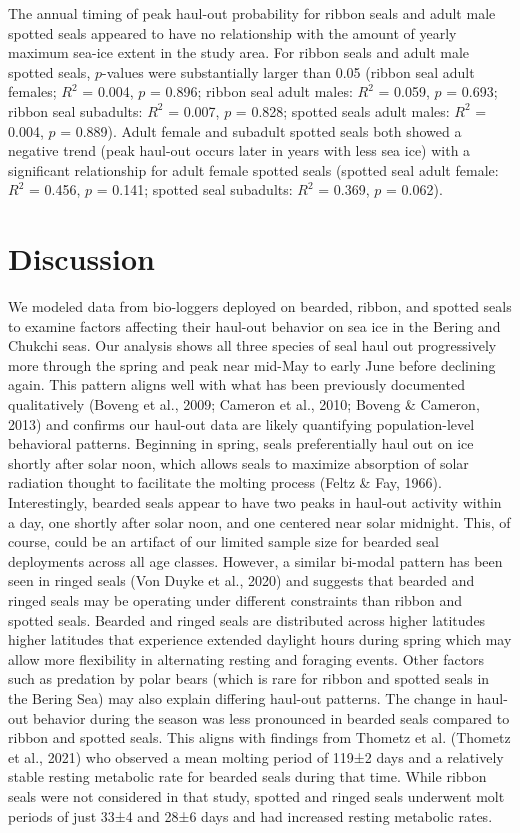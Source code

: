 \documentclass[fleqn,10pt,lineno]{wlpeerj} %
\begin{document}
The annual timing of peak haul-out probability for ribbon seals and adult
male spotted seals appeared to have
no relationship with the amount of yearly maximum sea-ice extent in the
study area. For ribbon seals and adult male spotted seals,
\(p\)-values were substantially larger than 0.05 (ribbon seal adult
females; \(R^{2}\) = 0.004, \(p\) = 0.896;
ribbon seal adult males: \(R^{2}\) = 0.059, \(p\) =
0.693; ribbon seal subadults: \(R^{2}\) =
0.007, \(p\) = 0.828; spotted seals
adult males: \(R^{2}\) = 0.004, \(p\) =
0.889). Adult female and subadult spotted seals both
showed a negative trend (peak haul-out occurs later in years with less
sea ice) with a significant relationship for adult female spotted seals
(spotted seal adult female: \(R^{2}\) =
0.456, \(p\) = 0.141; spotted seal
subadults: \(R^{2}\) = 0.369, \(p\) =
0.062).

\section*{Discussion}\label{discussion}

We modeled data from bio-loggers deployed on bearded, ribbon, and spotted seals
to examine factors affecting their haul-out behavior on sea ice in the Bering
and Chukchi seas. Our analysis shows all three species of seal haul out
progressively more through the spring and peak near mid-May to early June before
declining again. This pattern aligns well with what has been previously
documented qualitatively (Boveng et al., 2009; Cameron et al., 2010; Boveng \& Cameron, 2013) and confirms
our haul-out data are likely quantifying population-level behavioral patterns.
Beginning in spring, seals preferentially haul out on ice shortly after solar
noon, which allows seals to maximize absorption of solar radiation thought to
facilitate the molting process (Feltz \& Fay, 1966). Interestingly, bearded seals appear
to have two peaks in haul-out activity within a day, one shortly after solar
noon, and one centered near solar midnight. This, of course, could be an
artifact of our limited sample size for bearded seal deployments across all age
classes. However, a similar bi-modal pattern has been seen in ringed seals
(Von Duyke et al., 2020) and suggests that bearded and ringed seals may be operating
under different constraints than ribbon and spotted seals. Bearded and ringed
seals are distributed across higher latitudes higher latitudes that experience
extended daylight hours during spring which may allow more flexibility in
alternating resting and foraging events. Other factors such as predation by
polar bears (which is rare for ribbon and spotted seals in the Bering Sea) may
also explain differing haul-out patterns. The change in haul-out behavior during
the season was less pronounced in bearded seals compared to ribbon and spotted
seals. This aligns with findings from Thometz et al. (Thometz et al., 2021) who observed
a mean molting period of 119±2 days and a relatively stable resting metabolic
rate for bearded seals during that time. While ribbon seals were not considered
in that study, spotted and ringed seals underwent molt periods of just 33±4
and 28±6 days and had increased resting metabolic rates.
\end{document}
